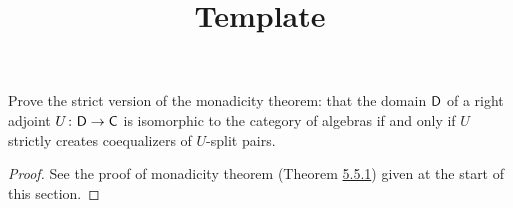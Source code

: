 \documentclass[../../solutions]{subfiles}
\title{Template}
\author{}
\begin{document}
\maketitle

%   

\begin{exercise}
  Prove the strict version of the monadicity theorem: that the domain
  ${\mathsf{D}}$ of a right adjoint ${U}\colon{{\mathsf{D}}}\to{{\mathsf{C}}}$ is isomorphic to the
  category of algebras if and only if $U$ strictly creates
  coequalizers of $U$-split pairs.
\end{exercise}

\begin{proof}
  See the proof of monadicity theorem (Theorem
  \hyperref[thm:5.5.1]{5.5.1}) given at the start of this section.
\end{proof}
\end{document}
